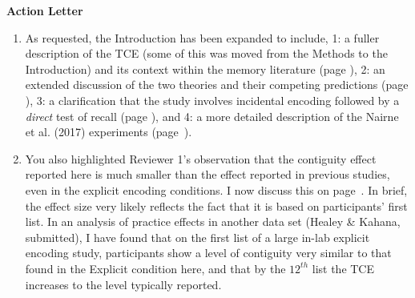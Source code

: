 \documentclass[12pt]{article}
\begin{document}
\vspace{20pt}

\textbf{\large{Action Letter}}


\begin{enumerate}

\item
	As requested, the Introduction has been expanded to include, 1: a fuller description of the TCE (some of this was moved from the Methods to the Introduction) and its context within the memory literature (page \pageref{TODO-1}), 2: %
	an extended discussion of the two theories and their competing predictions (page \pageref{TODO-2}),
	3: a clarification that the study involves incidental encoding followed by a \emph{direct} test of recall (page \pageref{TODO-3}), and 4:
	a more detailed description of the Nairne et al. (2017) experiments (page~\pageref{TODO-4}).

\item
	You also highlighted Reviewer 1's observation that the contiguity effect reported here is much smaller than the effect reported in previous studies, even in the explicit encoding conditions. I now discuss this on page~\pageref{TODO-5}. In brief, the effect size very likely reflects the fact that it is based on participants' first list. In an analysis of practice effects in another data set (Healey \& Kahana, submitted), I have found that on the first list of a large in-lab explicit encoding study, participants show a level of contiguity very similar to that found in the Explicit condition here, and that by the $12^{th}$ list the TCE increases to the level typically reported.


\end{enumerate}
\end{document}
